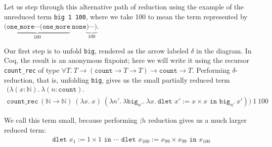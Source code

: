 Let us step through this alternative path of reduction using the example of the unreduced term \texttt{big 1 100}, where we take 100 to mean the term represented by $\underbrace{(\texttt{one\_more} \cdots (\texttt{one\_more}}_{100}\  \texttt{none}\underbrace{) \cdots )}_{100}$.

Our first step is to unfold \texttt{big}, rendered as the arrow labeled $\delta$ in the diagram.
In Coq, the result is an anonymous fixpoint; here we will write it using the recursor \texttt{count\_rec} of type $\forall T.\ T \to (\texttt{count} \to T \to T) \to \texttt{count} \to T$.
Performing $\delta$-reduction, that is, unfolding \texttt{big}, gives us the small partially reduced term
\begin{multline*}
\big(\lambda (x:\mathbb N).\ \lambda(n : \texttt{count}). \\
\texttt{count\_rec}\ (\mathbb N \to \mathbb N)\ (\lambda x.\ x)\ (\lambda n'.\ \lambda\texttt{big}_{n'}.\ \lambda x.\ \texttt{dlet }x' := x \times x\texttt{ in } \texttt{big}_{n'}\ x')\big)\ 1\ 100
\end{multline*}

We call this term small, because performing $\beta\iota$ reduction gives us a much larger reduced term:
\begin{align*}
& \texttt{dlet }x_1 := 1 \times 1\texttt{ in } \cdots \texttt{ dlet }x_{100} := x_{99} \times x_{99}\texttt{ in } x_{100}
\end{align*}

